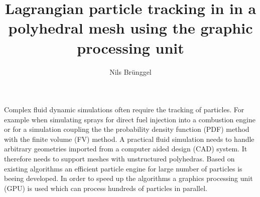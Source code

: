 \documentclass[12pt]{article}
\title{Lagrangian particle tracking in in a polyhedral mesh using the graphic processing unit}
\author{Nils Br\"unggel}
\begin{document}
\maketitle 
Complex fluid dynamic simulations often require the tracking of particles. For example when simulating sprays for direct fuel injection into a combustion engine or for a simulation coupling the the probability density function (PDF) method with the finite volume (FV) method. A practical fluid simulation needs to handle arbitrary geometries imported from a computer aided design (CAD) system. It therefore needs to support meshes with unstructured polyhedras.  Based on existing algorithms an efficient particle engine for large number of particles is beeing developed. In order to speed up the algorithms a graphics processing unit (GPU) is used which can process hundreds of particles in parallel.
\end{document}
